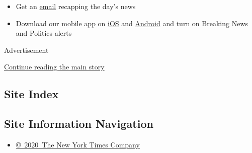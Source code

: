 \begin{itemize}
  \begin{itemize}
  \tightlist
  \item
    Get an
    \href{https://www.nytimes.com/newsletters/politics?action=click\&pgtype=Article\&state=default\&region=BELOW_MAIN_CONTENT\&context=storylines_guide}{email}
    recapping the day's news
  \end{itemize}

  \begin{itemize}
  \tightlist
  \item
    Download our mobile app on
    \href{https://apps.apple.com/us/app/nytimes/id284862083?ls=1\&mat_click_id=5c79ae7455014fd1bd66b5610c05b8f2-20191112-16948\&referrer=mat_click_id\%3D5c79ae7455014fd1bd66b5610c05b8f2-20191112-16948\%26link_click_id\%3D722930677036718082}{iOS}
    and
    \href{http://a.localytics.com/android?id=com.nytimes.android\&referrer=utm_source\%3Dother_nyt_mobile_web\%26utm_medium\%3DWeb\%2520page\%26utm_term\%3DGeneral\%2520Mobile\%2520Page\%26utm_campaign\%3DNYT\%2520Mobile\%2520General\%2520Page}{Android}
    and turn on Breaking News and Politics alerts
  \end{itemize}
\end{itemize}

Advertisement

\protect\hyperlink{after-bottom}{Continue reading the main story}

\hypertarget{site-index}{%
\subsection{Site Index}\label{site-index}}

\hypertarget{site-information-navigation}{%
\subsection{Site Information
Navigation}\label{site-information-navigation}}

\begin{itemize}
\tightlist
\item
  \href{https://help.nytimes.com/hc/en-us/articles/115014792127-Copyright-notice}{©~2020~The
  New York Times Company}
\end{itemize}

